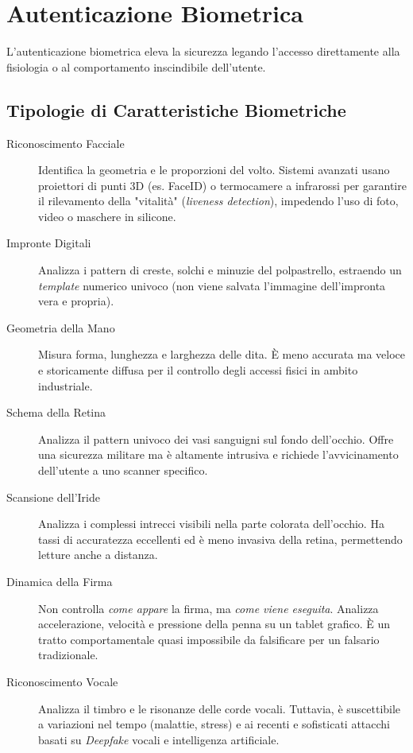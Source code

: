 \section{Autenticazione Biometrica}

L'autenticazione biometrica eleva la sicurezza legando l'accesso direttamente alla fisiologia o al comportamento inscindibile dell'utente.

\subsection{Tipologie di Caratteristiche Biometriche}

\begin{description}
    \item[Riconoscimento Facciale] Identifica la geometria e le proporzioni del volto. Sistemi avanzati usano proiettori di punti 3D (es. FaceID) o termocamere a infrarossi per garantire il rilevamento della "vitalità" (\textit{liveness detection}), impedendo l'uso di foto, video o maschere in silicone.
    \item[Impronte Digitali] Analizza i pattern di creste, solchi e minuzie del polpastrello, estraendo un \textit{template} numerico univoco (non viene salvata l'immagine dell'impronta vera e propria).
    \item[Geometria della Mano] Misura forma, lunghezza e larghezza delle dita. È meno accurata ma veloce e storicamente diffusa per il controllo degli accessi fisici in ambito industriale.
    \item[Schema della Retina] Analizza il pattern univoco dei vasi sanguigni sul fondo dell'occhio. Offre una sicurezza militare ma è altamente intrusiva e richiede l'avvicinamento dell'utente a uno scanner specifico.
    \item[Scansione dell'Iride] Analizza i complessi intrecci visibili nella parte colorata dell'occhio. Ha tassi di accuratezza eccellenti ed è meno invasiva della retina, permettendo letture anche a distanza.
    \item[Dinamica della Firma] Non controlla \textit{come appare} la firma, ma \textit{come viene eseguita}. Analizza accelerazione, velocità e pressione della penna su un tablet grafico. È un tratto comportamentale quasi impossibile da falsificare per un falsario tradizionale.
    \item[Riconoscimento Vocale] Analizza il timbro e le risonanze delle corde vocali. Tuttavia, è suscettibile a variazioni nel tempo (malattie, stress) e ai recenti e sofisticati attacchi basati su \textit{Deepfake} vocali e intelligenza artificiale.
\end{description}